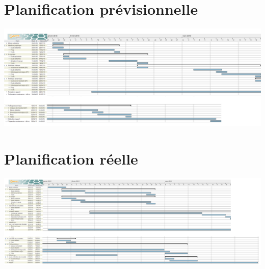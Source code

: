 \documentclass{report}
\begin{document}


\nocite{*}


\appendix
\chapter{Planification prévisionnelle}
		 \hspace{-4.2cm} 
			\includegraphics[scale=0.28]{../DiagrammePrevisionnel.png}
	\medskip
		
\chapter{Planification réelle}
		 \hspace{-4.5cm} 
			\includegraphics[scale=0.24]{../DiagrammeReel.png}

	\medskip
		
		
		
\end{document}
